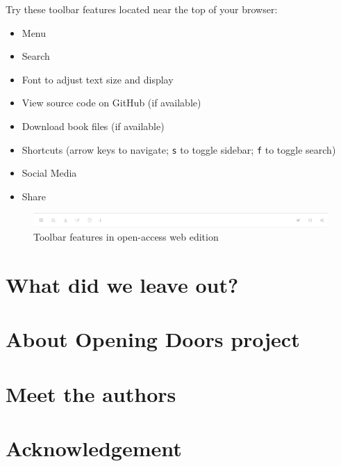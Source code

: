 \documentclass[
]{book}
\providecommand{\tightlist}{%
  \setlength{\itemsep}{0pt}\setlength{\parskip}{0pt}}
\theoremstyle{definition}
\theoremstyle{definition}
\theoremstyle{definition}
\theoremstyle{definition}
\theoremstyle{remark}
\begin{document}
Try these toolbar features located near the top of your browser:

\begin{itemize}
\tightlist
\item
  Menu
\item
  Search
\item
  Font to adjust text size and display
\item
  View source code on GitHub (if available)
\item
  Download book files (if available)
\item
  Shortcuts (arrow keys to navigate; \texttt{s} to toggle sidebar; \texttt{f} to toggle search)
\item
  Social Media
\item
  Share
\end{itemize}

\begin{figure}
\centering
\includegraphics{images/toolbarimage.png}
\caption{Toolbar features in open-access web edition}
\end{figure}

\hypertarget{what-did-we-leave-out}{%
\section*{What did we leave out?}\label{what-did-we-leave-out}}

\hypertarget{about-opening-doors-project}{%
\section*{About Opening Doors project}\label{about-opening-doors-project}}

\hypertarget{meet-the-authors}{%
\section*{Meet the authors}\label{meet-the-authors}}

\hypertarget{acknowledgement}{%
\section*{Acknowledgement}\label{acknowledgement}}
\end{document}
